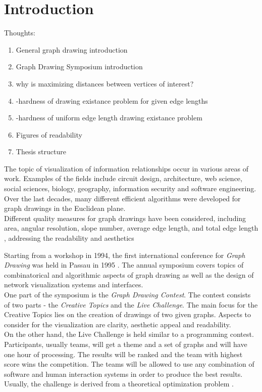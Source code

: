 \section{Introduction}

Thoughts:
\begin{enumerate}
	\item General graph drawing introduction
	\item Graph Drawing Symposium introduction
	\item why is maximizing distances between vertices of interest?
	\item \NP-hardness of drawing existance problem for given edge lengths
	\item \NP-hardness of uniform edge length drawing existance problem
	\item Figures of readability
	\item Thesis structure
\end{enumerate}



The topic of visualization of information relationships occur in various areas of work. Examples of the fields include circuit design, architecture, web science, social sciences, biology, geography, information security and software engineering. Over the last decades, many different efficient algorithms were developed for graph drawings in the Euclidean plane.\\
Different quality measures for graph drawings have been considered, including area, angular resolution, slope number, average edge length, and total edge length \cite{edge-length-ratio-2tree}, addressing the readability and aesthetics 
\bigskip


Starting from a workshop in 1994, the first international conference for \emph{Graph Drawing} was held in Passau in 1995 \cite{GD:Symposium}. The annual symposium covers topics of combinatorical and algorithmic aspects of graph drawing as well as the design of network visualization systems and interfaces.\\
One part of the symposium is the \emph{Graph Drawing Contest}. The contest consists of two parts - the \emph{Creative Topics} and the \emph{Live Challenge}. The main focus for the Creative Topics lies on the creation of drawings of two given graphs. Aspects to consider for the visualization are clarity, aesthetic appeal and readability.\\
On the other hand, the Live Challenge is held similar to a programming contest. Participants, usually teams, will get a theme and a set of graphs and will have one hour of processing. The results will be ranked and the team with highest score wins the competition. The teams will be allowed to use any combination of software and human interaction systems in order to produce the best results. Usually, the challenge is derived from a theoretical optimization problem \cite{GD:2021}.


